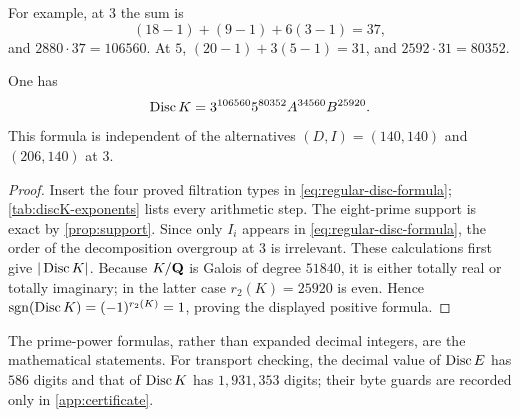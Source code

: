 For example, at $3$ the sum is
\[
 (18-1)+(9-1)+6(3-1)=37,
\]
and $2880\cdot37=106560$.  At $5$,
$(20-1)+3(5-1)=31$, and $2592\cdot31=80352$.

\begin{proposition}
\label{prop:discK}
One has
\[
 \operatorname{Disc} K=3^{106560}5^{80352}A^{34560}B^{25920}.
\]
This formula is independent of the alternatives
$(D,I)=(140,140)$ and $(206,140)$ at $3$.
\end{proposition}

\begin{proof}
Insert the four proved filtration types in
\cref{eq:regular-disc-formula}; \cref{tab:discK-exponents} lists every
arithmetic step.  The eight-prime support is exact by \cref{prop:support}.
Since only $I_i$ appears in \cref{eq:regular-disc-formula}, the order of the
decomposition overgroup at $3$ is irrelevant.  These calculations first give
$|\operatorname{Disc} K|$.  Because $K/\mathbf{Q}$ is Galois of degree $51840$, it is either totally
real or totally imaginary; in the latter case $r_2(K)=25920$ is even.  Hence
$\operatorname{sgn}(\operatorname{Disc} K)=(-1)^{r_2(K)}=1$, proving the displayed positive
formula.
\end{proof}

The prime-power formulas, rather than expanded decimal integers, are the
mathematical statements.  For transport checking, the decimal value of
$\operatorname{Disc} E$ has $586$ digits and that of $\operatorname{Disc} K$ has $1{,}931{,}353$
digits; their byte guards are recorded only in \cref{app:certificate}.
